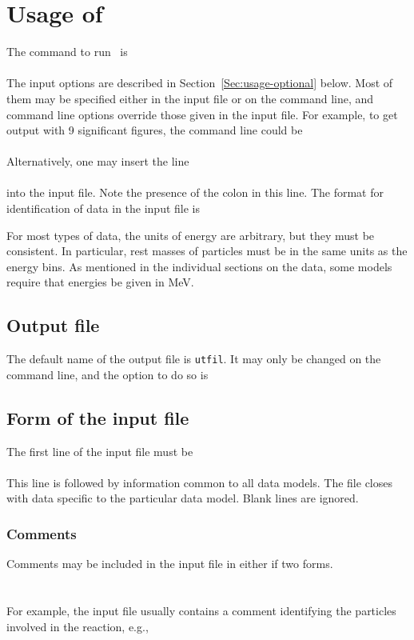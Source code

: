 \chapter{Usage of \gettransfer}
\label{Sec:usage}
The command to run \gettransfer\ is\\
  \\
The input options are described in Section~\ref{Sec:usage-optional} below.
Most of them may be specified either in the input file or on the
command line, and command line options override those given in the
input file.  For example, to get output with 9 significant figures,
the command line could be\\
\\
Alternatively, one may insert the line\\
   \\
into the input file.  Note the presence of the colon in this line.
The format for identification of data in the input file is\\

For most types of data, the units of energy are arbitrary, but they
must be consistent.  In particular, rest masses of particles must
be in the same units as the energy bins.  As mentioned in the
individual sections on the data, some models require that
energies be given in MeV.

\section{Output file}
The default name of the output file is \texttt{utfil}.  
It may only be changed on the command line,  and the option to do so is\\

\section{Form of the input file}
The first line of the input file must be\\
  \\
This line is followed by information common to all data models.
The file closes with data specific to the particular data model.
Blank lines are ignored.
  
\subsection{Comments}
Comments may be included in the input file in either if two forms.\\
 \\
 \\
 For example, the input file usually contains a comment identifying the
 particles involved in the reaction, e.g.,\\
 
